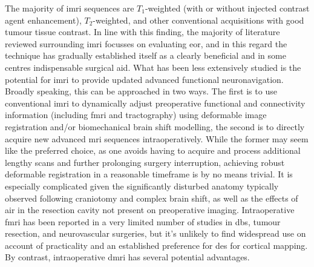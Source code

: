 
The majority of \gls{imri} sequences are $T_1$-weighted (with or without injected contrast agent enhancement), $T_2$-weighted, and other conventional acquisitions with good tumour tissue contrast\autocite{Kubben2011,Coburger2019}.
In line with this finding, the majority of literature reviewed surrounding \gls{imri} focusses on evaluating \gls{eor}, and in this regard the technique has gradually established itself as a clearly beneficial and in some centres indispensable surgical aid\autocite{Garzon-Muvdi2019,Hlavac2020}.
What has been less extensively studied is the potential for \gls{imri} to provide updated advanced functional neuronavigation.
Broadly speaking, this can be approached in two ways.
The first is to use conventional \gls{imri} to dynamically adjust preoperative functional and connectivity information (including \gls{fmri} and tractography) using deformable image registration and/or biomechanical brain shift modelling, the second is to directly acquire new advanced \gls{mri} sequences intraoperatively.
While the former may seem like the preferred choice, as one avoids having to acquire and process additional lengthy scans and further prolonging surgery interruption, achieving robust deformable registration in a reasonable timeframe is by no means trivial.
It is especially complicated given the significantly disturbed anatomy typically observed following craniotomy and complex brain shift, as well as the effects of air in the resection cavity not present on preoperative imaging.
Intraoperative \gls{fmri} has been reported in a very limited number of studies in \gls{dbs}\autocite{Hiss2015,Knight2015}, tumour resection\autocite{Roder2016a,Qiu2017a}, and neurovascular\autocite{Muscas2019} surgeries, but it's unlikely to find widespread use on account of practicality and an established preference for \gls{des} for cortical mapping.
By contrast, intraoperative \gls{dmri} has several potential advantages.

